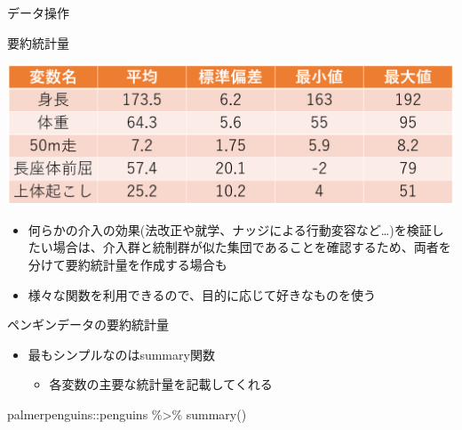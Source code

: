 \documentclass[
  ignorenonframetext,
]{beamer}
\newenvironment{Shaded}{\begin{snugshade}}{\end{snugshade}}
\newcommand{\FunctionTok}[1]{\textcolor[rgb]{0.00,0.00,0.00}{#1}}
\newcommand{\NormalTok}[1]{#1}
\newcommand{\SpecialCharTok}[1]{\textcolor[rgb]{0.00,0.00,0.00}{#1}}
\providecommand{\tightlist}{%
  \setlength{\itemsep}{0pt}\setlength{\parskip}{0pt}}
\begin{document}
\begin{frame}[fragile]{データ操作}
\begin{block}{要約統計量}
\begin{center}\includegraphics[width=0.8\linewidth]{figs/summary_ex} \end{center}

\begin{itemize}
\tightlist
\item
  何らかの介入の効果(法改正や就学、ナッジによる行動変容など\ldots)を検証したい場合は、介入群と統制群が似た集団であることを確認するため、両者を分けて要約統計量を作成する場合も
\item
  様々な関数を利用できるので、目的に応じて好きなものを使う
\end{itemize}
\end{block}

\begin{block}{ペンギンデータの要約統計量}
\protect\hypertarget{ux30daux30f3ux30aeux30f3ux30c7ux30fcux30bfux306eux8981ux7d04ux7d71ux8a08ux91cf}{}
\begin{itemize}
\tightlist
\item
  最もシンプルなのはsummary関数

  \begin{itemize}
  \tightlist
  \item
    各変数の主要な統計量を記載してくれる
  \end{itemize}
\end{itemize}

\begin{Shaded}
\begin{Highlighting}[]
\NormalTok{palmerpenguins}\SpecialCharTok{::}\NormalTok{penguins }\SpecialCharTok{\%\textgreater{}\%}
  \FunctionTok{summary}\NormalTok{()}
\end{Highlighting}
\end{Shaded}


\end{block}
\end{frame}
\end{document}
